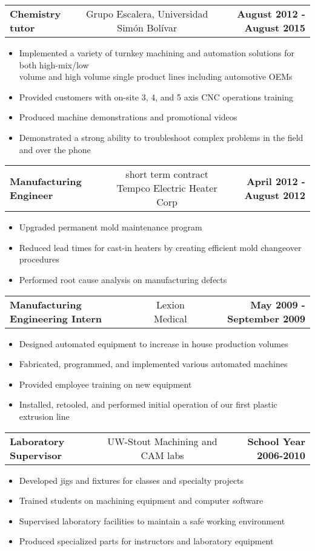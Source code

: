 \documentclass[11pt,letterpaper]{article}
\makeatletter
\newcommand{\headerrow}[3]
{\vspace{0.4em}
\noindent
\begin{tabular*}{\textwidth}{l @{\extracolsep{\fill}} cr}
	\textbf{#1} & %
	#2 &		  %
	\textbf{#3}\\ %
\end{tabular*}}
\makeatother
\begin{document}
	\headerrow
		{Chemistry tutor}
		{Grupo Escalera, Universidad Simón Bolívar}
		{August 2012 - August 2015}
	\begin{itemize}
		\item Implemented a variety of turnkey machining and automation solutions for both high-mix/low \\volume and high volume single product lines including automotive OEMs
		\item Provided customers with on-site 3, 4, and 5 axis CNC operations training
		\item Produced machine demonstrations and promotional videos%
		\item Demonstrated a strong ability to troubleshoot complex problems in the field and over the phone
	\end{itemize}
	
	\headerrow
		{Manufacturing Engineer}
		{short term contract Tempco Electric Heater Corp}
		{April 2012 - August 2012}
	\begin{itemize}
		\item Upgraded permanent mold maintenance program
		\item Reduced lead times for cast-in heaters by creating efficient mold changeover procedures
		\item Performed root cause analysis on manufacturing defects
	\end{itemize}

	\headerrow
		{Manufacturing Engineering Intern}
		{Lexion Medical}
		{May 2009 - September 2009}
	\begin{itemize}
		\item Designed automated equipment to increase in house production volumes
		\item Fabricated, programmed, and implemented various automated machines
		\item Provided employee training on new equipment
		\item Installed, retooled, and performed initial operation of our first plastic extrusion line
	\end{itemize}

	\headerrow
		{Laboratory Supervisor}
		{UW-Stout Machining and CAM labs}
		{School Year 2006-2010}
	\begin{itemize}
		\item Developed jigs and fixtures for classes and specialty projects
		\item Trained students on machining equipment and computer software
		\item Supervised laboratory facilities to maintain a safe working environment
		\item Produced specialized parts for instructors and laboratory equipment
	\end{itemize}
	
\end{document}
